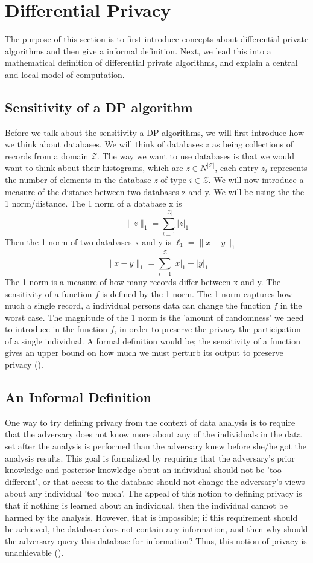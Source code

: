 \documentclass[11pt]{article}
\theoremstyle{definition}
\begin{document}
\section{Differential Privacy}
The purpose of this section is to first introduce concepts about differential private algorithms and then give a informal definition. Next, we lead this into a mathematical definition of differential private algorithms, and explain a central and local model of computation. 
\subsection{Sensitivity of a DP algorithm}
Before we talk about the sensitivity a DP algorithms, we will first introduce how we think about databases.
We will think of databases $z$ as being collections of records from a domain $\mathcal{Z}$. The way we want to use databases is that we would want to think about their histograms, which are $z\in N^{|\mathcal{Z}|} $, each entry $z_i$ represents the number of elements in the database $z$ of type $i\in \mathcal{Z}$. We will now introduce a measure of the distance between two databases z and y. We will be using the the 1 norm/distance. The 1 norm of a database x is 
\[\lVert z \rVert_1 = \sum_{i=1}^{|\mathcal{Z}|} | z |_1\]
Then the 1 norm of two databases x and y is $\ell_1 = \lVert x-y \rVert_1$
\[\lVert x-y \rVert_1 = \sum_{i=1}^{|\mathcal{Z}|} | x |_1-| y |_1\]
The 1 norm is a measure of how many records differ between x and y. The sensitivity of a function $f$ is defined by the 1 norm. The 1 norm captures how much a single record, a individual persons data can change the function $f$ in the worst case. The magnitude of the 1 norm is the 'amount of randomness' we need to introduce in the function $f$, in order to preserve the privacy the participation of a single individual. A formal definition would be; the sensitivity of a function gives an upper bound on how much we must perturb its output to preserve privacy (\cite[17]{algo_fun}).

\subsection{An Informal Definition}
One way to try defining privacy from the context of data analysis is to require that the adversary does not know more about any of the individuals in the data set after the analysis is performed than the adversary knew before she/he got the analysis results. This goal is formalized by requiring that the adversary's prior knowledge and posterior knowledge about an individual should not be 'too different', or that access to the database should not change the adversary's views about any individual 'too much'.
The appeal of this notion to defining privacy is that if nothing is learned about an individual, then the individual cannot be harmed by the analysis. However, that is impossible; if this requirement should be achieved, the database does not contain any information, and then why should the adversary query this database for information? Thus, this notion of privacy is unachievable (\cite[13]{algo_fun}). 
\end{document}
